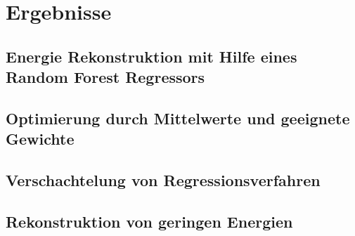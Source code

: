 \chapter{Ergebnisse}

\section{Energie Rekonstruktion mit Hilfe eines Random Forest Regressors}


\section{Optimierung durch Mittelwerte und geeignete Gewichte}


\section{Verschachtelung von Regressionsverfahren}


\section{Rekonstruktion von geringen Energien}

